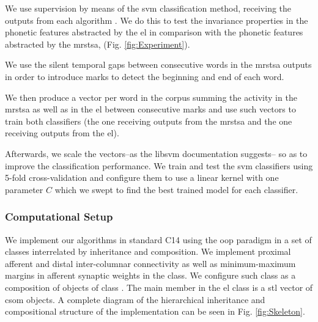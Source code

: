 \documentclass[10pt,letterpaper]{article}
\newcommand{\CC}{C\nolinebreak\hspace{-.05em}\raisebox{.4ex}{\tiny\bf +}\nolinebreak\hspace{-.10em}\raisebox{.4ex}{\tiny\bf +}}
\begin{document}

We use supervision by means of the \gls{svm} classification
method, receiving the outputs from each algorithm \cite{CC01a, libsvm}. We do this to test the invariance properties in the phonetic features abstracted by the \gls{el} in comparison
with the phonetic features abstracted by the \gls{mrstsa}, 
(Fig. \ref{fig:Experiment}).

We use the silent temporal gaps between consecutive words in the \gls{mrstsa} outputs in order to introduce marks to
detect the beginning and end of each word.

We then produce a vector per word in the corpus summing the activity in the \gls{mrstsa} as well as in the \gls{el} between consecutive marks
and use such vectors to train both classifiers (the one receiving outputs from the \gls{mrstsa} and the one receiving outputs from the \gls{el}).

Afterwards, we scale the vectors--as the \gls{libsvm} documentation suggests--
so as to improve the classification performance.
We train and test the \gls{svm} classifiers using 5-fold cross-validation
and configure them to use a linear kernel with one parameter $C$ which
we swept to find the best trained model for each classifier.










\subsubsection*{Computational Setup}
\label{Comp_setup}

We implement our algorithms in standard
\CC14 using the \gls{oop} paradigm in a set of classes interrelated by inheritance and composition.
We implement proximal afferent and distal inter-columnar connectivity  
as well as minimum-maximum margins in afferent synaptic weights in the  class.
We configure such class as a composition of objects of class .
The main member in the \gls{el} class is a \gls{stl} vector of \gls{csom} objects.
A complete diagram of the hierarchical inheritance and compositional structure of the implementation
can be seen in Fig. \ref{fig:Skeleton}.
\end{document}
